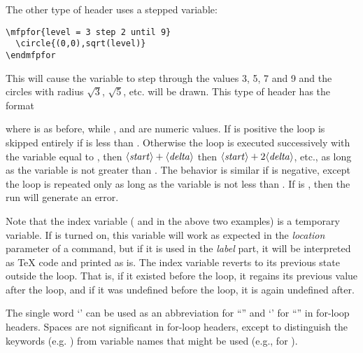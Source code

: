 \documentclass[letterpaper]{article}
\begin{document}
The other type of header uses a stepped variable:
\begin{verbatim}
\mfpfor{level = 3 step 2 until 9}
  \circle{(0,0),sqrt(level)}
\endmfpfor
\end{verbatim}
This will cause the \MF{} variable  to step through the
values 3, 5, 7 and 9 and the circles with radius $\sqrt{3}$, $\sqrt{5}$,
etc. will be drawn. This type of header has the format
\begin{display}
\end{display}
where  is as before, while ,  and
 are numeric values. If  is positive the loop is
skipped entirely if  is less than . Otherwise the
loop is executed successively with the variable equal to ,
then $\langle\mbox{\rmfamily\itshape start\/}\rangle + \langle\mbox{\rmfamily\itshape delta\/}\rangle$ then $\langle\mbox{\rmfamily\itshape start\/}\rangle + 2\langle\mbox{\rmfamily\itshape delta\/}\rangle$,
etc., as long as the variable is not greater than . The
behavior is similar if  is negative, except the loop is
repeated only as long as the variable is not less than . If
 is , then the \MF{} run will generate an error.

Note that the index variable ( and  in the above
two examples) is a temporary \MF{} variable. If  is turned
on, this variable will work as expected in the \emph{location} parameter
of a  command, but if it is used in the \emph{label} part, it
will be interpreted as \TeX{} code and printed as is. The index variable
reverts to its previous state outside the loop. That is, if it existed
before the loop, it regains its previous value after the loop, and if it
was undefined before the loop, it is again undefined after.

The single word `' can be used as an abbreviation for
``'' and `' for ``''
in for-loop headers. Spaces are not significant in for-loop headers,
except to distinguish the keywords (e.g. ) from variable names
that might be used (e.g., for ).

\begin{cd}
  \\
  \ \\
%
\end{cd}
\end{document}
